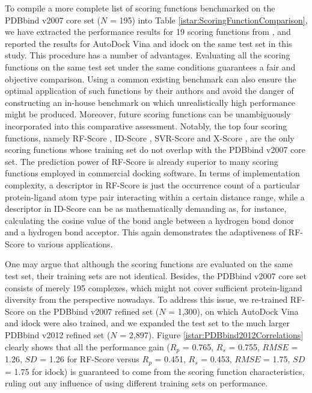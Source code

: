 To compile a more complete list of scoring functions benchmarked on the PDBbind v2007 core set ($N$ = 195) into Table \ref{istar:ScoringFunctionComparison}, we have extracted the performance results for 19 scoring functions from \citep{1313,564,1305,1295}, and reported the results for AutoDock Vina and idock on the same test set in this study. This procedure has a number of advantages. Evaluating all the scoring functions on the same test set under the same conditions guarantees a fair and objective comparison. Using a common existing benchmark can also ensure the optimal application of such functions by their authors and avoid the danger of constructing an in-house benchmark on which unrealistically high performance might be produced. Moreover, future scoring functions can be unambiguously incorporated into this comparative assessment. Notably, the top four scoring functions, namely RF-Score \citep{564}, ID-Score \citep{1305}, SVR-Score \citep{1295} and X-Score \citep{573}, are the only scoring functions whose training set do not overlap with the PDBbind v2007 core set. The prediction power of RF-Score is already superior to many scoring functions employed in commercial docking software. In terms of implementation complexity, a descriptor in RF-Score is just the occurrence count of a particular protein-ligand atom type pair interacting within a certain distance range, while a descriptor in ID-Score can be as mathematically demanding as, for instance, calculating the cosine value of the bond angle between a hydrogen bond donor and a hydrogen bond acceptor. This again demonstrates the adaptiveness of RF-Score to various applications.

One may argue that although the scoring functions are evaluated on the same test set, their training sets are not identical. Besides, the PDBbind v2007 core set consists of merely 195 complexes, which might not cover sufficient protein-ligand diversity from the perspective nowadays. To address this issue, we re-trained RF-Score on the PDBbind v2007 refined set ($N$ = 1,300), on which AutoDock Vina and idock were also trained, and we expanded the test set to the much larger PDBbind v2012 refined set ($N$ = 2,897). Figure \ref{istar:PDBbind2012Correlations} clearly shows that all the performance gain ($R_p$ = 0.765, $R_s$ = 0.755, $RMSE$ = 1.26, $SD$ = 1.26 for RF-Score versus $R_p$ = 0.451, $R_s$ = 0.453, $RMSE$ = 1.75, $SD$ = 1.75 for idock) is guaranteed to come from the scoring function characteristics, ruling out any influence of using different training sets on performance.

